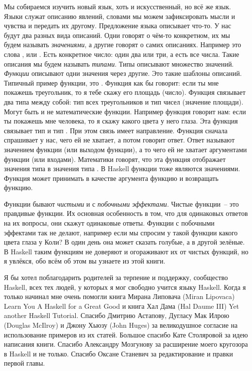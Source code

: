 Мы собираемся изучить новый язык, хоть и искусственный,
но всё же язык. Языки служат описанию явлений, словами
мы можем зафиксировать мысли и чувства и передать их
другому. Предложение языка описывает что-то. 
У нас будут два разных вида описаний. Одни
говорят о чём-то конкретном, их мы будем называть \emph{значениями},
а другие говорят о самих описаниях.
Например это слова ,  или . 
Есть конкретное число: один два или три, а есть все числа. 
Такие описания мы будем называть \emph{типами}. Типы описывают множество 
значений.  \emph{Функции} описывают одни значения через другие.
Это такие шаблоны описаний. Типичный пример функции, это
. Функция как бы говорит:
если ты мне покажешь треугольник, то я тебе скажу его площадь (число).
Функция  связывает
два типа между собой: тип всех треугольников и тип чисел (значение площади).
Могут быть и не математические функции. Например функция
 говорит нам: если ты покажешь мне
человека, то я скажу какого цвета у него глаза. Эта функция
связывает тип  и тип . При этом
связь имеет направление. Функция сначала спрашивает у нас,
чего ей не хватает, а потом говорит ответ. Ответ называют
значением функции (или выходом функции), а то чего ей не хватает
аргументами функции (или входами). Математики 
говорят, что эта функция отображает значения типа 
в значения типа  . В Haskell функции тоже
являются значениями. Функция может принимать в качестве аргумента
функцию и возвращать функцию. 

Функции бывают \emph{чистыми} и с 
 \emph{побочными эффектами}. 
Чистые функции~-- это правдивые функции. Их основная особенность в том, что
для одинаковых ответов на их вопросы, они скажут одинаковые ответы.
Функции с побочными эффектами так не делают, например если
мы спросим у такой функции какого цвета глаза у Коли? 
В один день она может сказать голубые, а в другой зелёные. 
В Haskell таким функциям не доверяют и огораживают их
от чистых функций, но я увлёкся, обо всём об этом вы узнаете
из этой книги.


Я бы хотел поблагодарить родителей за терпение и поддержку,
сообщество Haskell, всех тех
людей, у которых я мог свободно учится языку Haskell. 
Когда я только начинал мне очень помогли 
книга Мирана Липовача (Miran Lipovaca)
Learn You A Haskell for a Great Good и книга Хал Дама 
(Hal Daume III) Yet another Haskell Tutorial.
Спасибо Дмитрию Астапову, Дугласу Мак Илрою (Douglas McIlroy) и 
Джону Хьюзу (John Huges) за великодушное согласие на использование
примеров из их статей. 
Большое спасибо Кате Столяровой за идею написания книги. 
Спасибо Александру Мозгунову за расширение моего кругозора
в Haskell и не только. 
Спасибо Оксане Станевич за редактирование и правки первой главы. 


